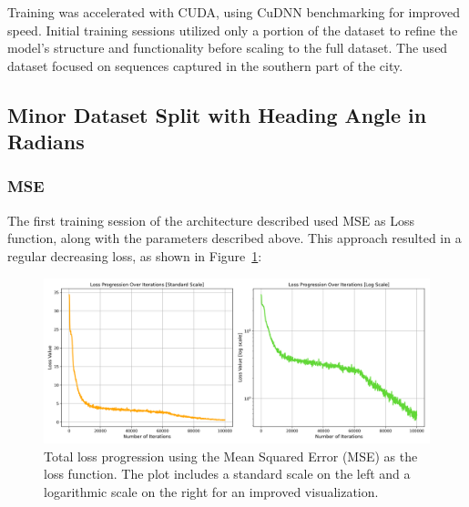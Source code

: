 Training was accelerated with CUDA, using CuDNN benchmarking for improved speed. Initial training sessions utilized only a portion of the dataset to refine the model’s structure and functionality before scaling to the full dataset. The used dataset focused on sequences captured in the southern part of the city. 

\subsection*{Minor Dataset Split with Heading Angle in Radians}
\subsubsection*{MSE}
The first training session of the architecture described used MSE as Loss function, along with the parameters described above. This approach resulted in a regular decreasing loss, as shown in Figure~\ref{fig:mse-loss-progression}:
\begin{figure}[H]
    \centering
    \includegraphics[width=1\linewidth]{LateX//figs/loss_total_mse_progression_comparison.png}
    \caption{Total loss progression using the Mean Squared Error (MSE) as the loss function. The plot includes a standard scale on the left and a logarithmic scale on the right for an improved visualization.}
    \label{fig:mse-loss-progression}
\end{figure}

